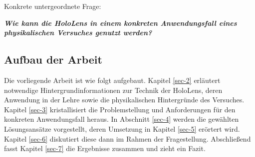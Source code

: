 Konkrete untergeordnete Frage:
\begin{center}
	\textit{\textbf{Wie kann die HoloLens in einem konkreten Anwendungsfall eines physikalischen Versuches genutzt werden?}}
\end{center}

\begin{comment}
\subsection{Aufgabenstellung}

Im Rahmen der Arbeit soll anhand der HoloLens untersucht werden, wie diese in der Physik-Lehre eingesetzt werden kann, um physikalische Inhalte zu vermitteln. Insbesondere soll betrachtet werden, wie physikalische Experimente mittels Mixed Reality Anwendungen durch zusätzliche Inhalte angereichert werden können.\\

\par
Dazu sind zunächst die technischen Möglichkeiten und Voraussetzungen der HoloLens zu betrachten und in Zusammenhang mit dem Anwendungsfall zu bringen. Weiterhin sind bestehende Ansätze im Einsatz von Mixed Reality Technologie in der Lehre, besonders in der Physik-Lehre, herauszuarbeiten und einzuordnen.

Davon ausgehend soll der Fragestellung anhand eines konkreten Beispiels nachgegangen werden. Für einen ausgewählten Versuchsaufbau sind die darzustellenden Objekte und Informationen sowie das Zusammenspiel dieser mit dem aufgebauten Experiment, der Umgebung und den Nutzern zu entwickeln. Für den ausgewählten Anwendungsfall soll eine Umsetzung mit der HoloLens konzipiert, designet und prototypisch implementiert werden.
\end{comment}

\subsection{Aufbau der Arbeit}
\label{sec-1-3}
Die vorliegende Arbeit ist wie folgt aufgebaut. Kapitel \ref{sec-2} erläutert notwendige Hintergrundinformationen zur Technik der HoloLens, deren Anwendung in der Lehre sowie die physikalischen Hintergründe des Versuches. Kapitel \ref{sec-3} kristallisiert die Problemstellung und Anforderungen für den konkreten Anwendungsfall heraus. In Abschnitt \ref{sec-4} werden die gewählten Lösungsansätze vorgestellt, deren Umsetzung in Kapitel \ref{sec-5} erörtert wird. Kapitel \ref{sec-6} diskutiert diese dann im Rahmen der Fragestellung. Abschließend fasst Kapitel \ref{sec-7} die Ergebnisse zusammen und zieht ein Fazit.